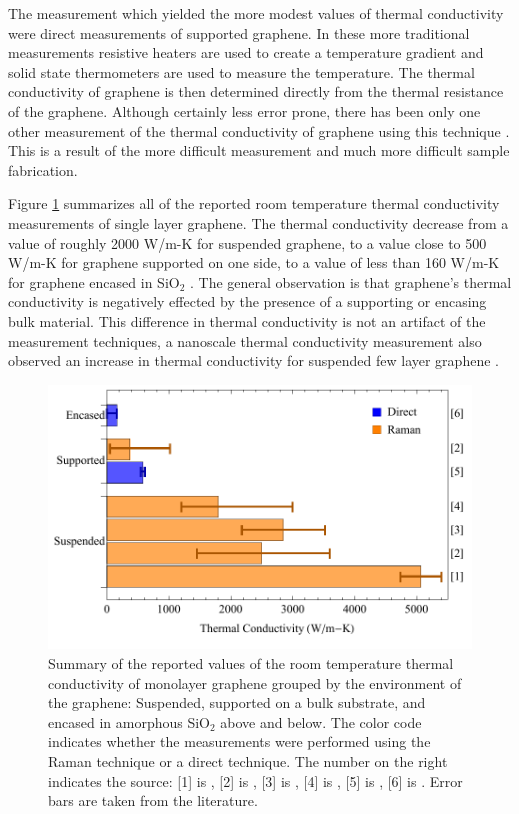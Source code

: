 The measurement which yielded the more modest values of thermal conductivity were direct measurements of supported graphene.
In these more traditional measurements resistive heaters are used to create a temperature gradient and solid state thermometers are used to measure the temperature.
The thermal conductivity of graphene is then determined directly from the thermal resistance of the graphene.
Although certainly less error prone, there has been only one other measurement of the thermal conductivity of graphene using this technique \cite{Jang2010}.
This is a result of the more difficult measurement and much more difficult sample fabrication.

Figure \ref{fig:therm:lit} summarizes all of the reported room temperature thermal conductivity measurements of single layer graphene.
The thermal conductivity decrease from a value of roughly 2000 W/m-K for suspended graphene, to a value close to 500 W/m-K for graphene supported on one side, to a value of less than 160 W/m-K for graphene encased in SiO$_2$ \cite{Jang2010}.
The general observation is that graphene's thermal conductivity is negatively effected by the presence of a supporting or encasing bulk material.
This difference in thermal conductivity is not an artifact of the measurement techniques, a nanoscale thermal conductivity measurement also observed an increase in thermal conductivity for suspended few layer graphene \cite{Pumarol2012}.

\begin{figure}
	\begin{center}
	\includegraphics{Figs_Thermal/Thermal_lit.pdf}
	\end{center}
	\caption[Summary of the reported values of the room temperature thermal conductivity of monolayer graphene]{
	\label{fig:therm:lit}
		Summary of the reported values of the room temperature thermal conductivity of monolayer graphene grouped by the environment of the graphene: Suspended, supported on a bulk substrate, and encased in amorphous SiO$_2$ above and below.
		The color code indicates whether the measurements were performed using the Raman technique or a direct technique.
		The number on the right indicates the source: [1] is \cite{Balandin2008}, [2] is \cite{Cai2010}, [3] is \cite{Chen2011a}, [4] is \cite{Lee2011}, [5] is \cite{Seol2010}, [6] is \cite{Jang2010}.
		Error bars are taken from the literature.
	}
\end{figure}

